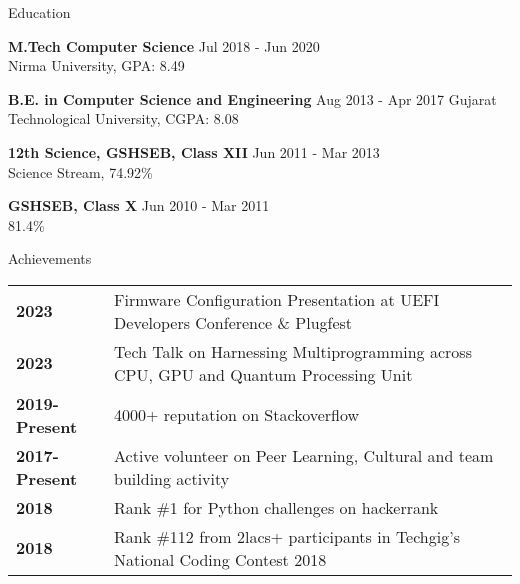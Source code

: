 \documentclass{resume} %
\begin{document}



\begin{rSection}{Education}

{\bf M.Tech Computer Science} \hfill {Jul 2018 - Jun 2020 }
\\
Nirma University, GPA: 8.49

{\bf B.E. in Computer Science and Engineering} \hfill {Aug 2013 - Apr 2017 }
Gujarat Technological University, CGPA: 8.08

{\textbf{12th Science, GSHSEB, Class XII}}  \hfill {Jun 2011 - Mar 2013 }\\
Science Stream, 74.92\%

{\textbf{GSHSEB, Class X}}  \hfill {Jun 2010 - Mar 2011 }\\
81.4\%


\end{rSection}

\begin{rSection}{Achievements}

\begin{tabular}{ @{} >{\bfseries}l @{\hspace{6ex}} l }
2023 & Firmware Configuration Presentation at UEFI Developers Conference \& Plugfest \\
2023 & Tech Talk on Harnessing Multiprogramming across CPU, GPU and Quantum Processing Unit \\
2019-Present & 4000+ reputation on Stackoverflow \\
2017-Present & Active volunteer on Peer Learning, Cultural and team building activity \\
2018 & Rank \#1 for Python challenges on hackerrank \\
2018 & Rank \#112 from 2lacs+ participants in Techgig's National Coding Contest 2018 \\

\end{tabular}

\end{rSection}
\end{document}
